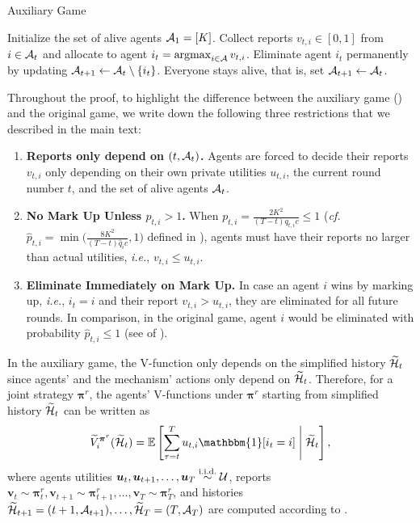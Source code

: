 \begin{algorithm}[!t]
\caption{Auxiliary Game}
\label{alg:auxiliary game}
\begin{algorithmic}[1]
\State Initialize the set of alive agents $\mathcal{A}_1=[K]$.
\State Collect reports $v_{t,i}\in [0,1]$ from $i\in \mathcal{A}_t$ and allocate to agent $i_t=\argmax_{i\in \mA} v_{t,i}$.
\State Eliminate agent $i_t$ permanently by updating $\mathcal{A}_{t+1}\gets \mathcal{A}_t\setminus \{i_t\}$.
\Else
\State Everyone stays alive, that is, set $\mathcal{A}_{t+1}\gets \mathcal{A}_t$.
\EndIf
\EndFor
\end{algorithmic}
\end{algorithm}

Throughout the proof, to highlight the difference between the auxiliary game () and the original game, we write down the following three restrictions that we described in the main text:
\begin{enumerate}
\item \textbf{Reports only depend on $(t,\mathcal{A}_t)$.} Agents are forced to decide their reports $v_{t,i}$ only depending on their own private utilities $u_{t,i}$, the current round number $t$, and the set of alive agents $\mathcal{A}_t$. \label{item:only simplified history formal}
\item \textbf{No Mark Up Unless $p_{t,i}>1$.} When $p_{t,i}=\frac{2K^2}{(T-t)q_{t,i} c} \leq 1$ (\textit{cf.} $\hat p_{t,i}=\min\big (\frac{8K^2}{(T-t) \hat q_i c},1\big )$ defined in ), agents must have their reports no larger than actual utilities, \textit{i.e.}, $v_{t,i}\le u_{t,i}$. \label{item:no mark up unless p>=1 formal}
\item \textbf{Eliminate Immediately on Mark Up.} In case an agent $i$ wins by marking up, \textit{i.e.}, $i_t=i$ and their report $v_{t,i}>u_{t,i}$, they are eliminated for all future rounds. In comparison, in the original game, agent $i$ would be eliminated with probability $\hat p_{t,i}\le 1$ (see  of ).\label{item:eliminate immediately formal}
\end{enumerate}

In the auxiliary game, the V-function only depends on the simplified history $\widetilde {\mathcal{H}}_t$ since agents' and the mechanism' actions only depend on $\widetilde {\mathcal{H}}_t$. Therefore, for a joint strategy ${\bm \pi}^r$, the agents' V-functions under ${\bm \pi}^r$ starting from simplified history $\widetilde {\mathcal{H}}_t$ can be written as
\begin{equation*}
\tilde V_i^{{\bm \pi}^r}(\tilde \mH_t)=\E\left [\sum_{\tau=t}^T u_{t,i}\mathbbm{1}[i_t=i]\middle \vert \tilde \mH_t\right ],
\end{equation*}
where agents utilities $\bm u_t,\bm u_{t+1},\ldots,\bm u_T\overset{\text{i.i.d.}}{\sim}\mathcal{U}$, reports $\bm v_t\sim {\bm \pi}^r_t,\bm v_{t+1}\sim {\bm \pi}^r_{t+1},\ldots,\bm v_T\sim {\bm \pi}^r_T$, and histories $\widetilde {\mathcal{H}}_{t+1}=(t+1,\mathcal{A}_{t+1}),\ldots,\widetilde {\mathcal{H}}_T=(T,\mathcal{A}_T)$ are computed according to .

